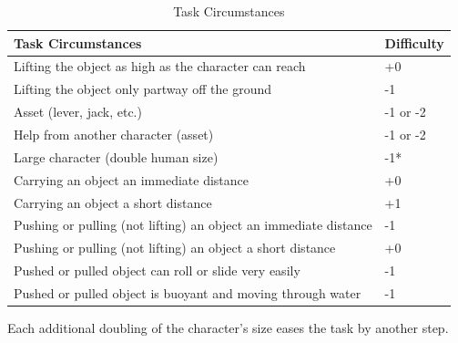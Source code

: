 \newpage

\begin{table}[h]
\begin{threeparttable}

\centering

\caption{Task Circumstances}
\label{lab:Task Circumstances}

\begin{tabularx}{\textwidth}{| Y | p{1.5cm} |}

\toprule

\textbf{Task Circumstances} & \textbf{Difficulty} \\  \hline

\midrule 

Lifting the object as high as the character can reach & +0 \\ \hline
Lifting the object only partway off the ground & -1 \\  \hline 
Asset (lever, jack, etc.) & -1 or -2 \\  \hline
Help from another character (asset) & -1 or -2 \\  \hline
Large character (double human size) & -1* \\  \hline
Carrying an object an immediate distance & +0 \\  \hline
Carrying an object a short distance & +1 \\  \hline
Pushing or pulling (not lifting) an object an immediate distance & -1 \\  \hline 
Pushing or pulling (not lifting) an object a short distance & +0 \\  \hline
Pushed or pulled object can roll or slide very easily & -1 \\  \hline
Pushed or pulled object is buoyant and moving through water & -1 \\ \hline

\bottomrule 
\end{tabularx}

\begin{tablenotes}
\item *Each additional doubling of the character’s size eases the task by another step.
\end{tablenotes}

\end{threeparttable}
\end{table}

